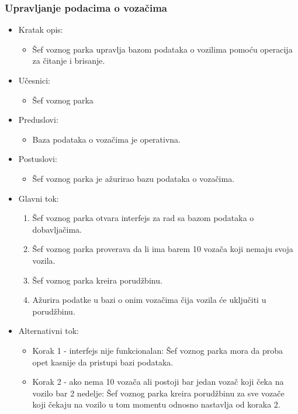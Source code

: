 \subsubsection{\bfseries Upravljanje podacima o vozačima}

\begin{itemize}
	\item Kratak opis:
		\begin{itemize}
			\item Šef voznog parka upravlja bazom podataka o vozilima pomoću operacija za čitanje i brisanje.
		\end{itemize}

	\item Učesnici:
		\begin{itemize}
		    \item Šef voznog parka
		\end{itemize}


	\item Preduslovi:
		\begin{itemize}
		    \item Baza podataka o vozačima je operativna.
		\end{itemize}


	\item Postuslovi:
		\begin{itemize}
			\item Šef voznog parka je ažurirao bazu podataka o vozačima.
	\end{itemize}

	\item Glavni tok:
		\begin{enumerate}
		    \item Šef voznog parka otvara interfejs za rad sa bazom podataka o dobavljačima.
		    \item Šef voznog parka proverava da li ima barem 10 vozača koji nemaju svoja vozila.
		    \item Šef voznog parka kreira porudžbinu.
			\item Ažurira podatke u bazi o onim vozačima čija vozila će uključiti u porudžbinu.
		\end{enumerate}

	\item Alternativni tok:
		\begin{itemize}
		    \item Korak 1 - interfejs nije funkcionalan: Šef voznog parka mora da proba opet kasnije da pristupi bazi podataka.
			\item Korak 2 - ako nema 10 vozača ali postoji bar jedan vozač koji čeka na vozilo bar 2 nedelje: Šef voznog parka kreira porudžbinu za sve vozače koji čekaju na vozilo u tom momentu odnosno nastavlja od koraka 2.
		\end{itemize}

\end{itemize}

